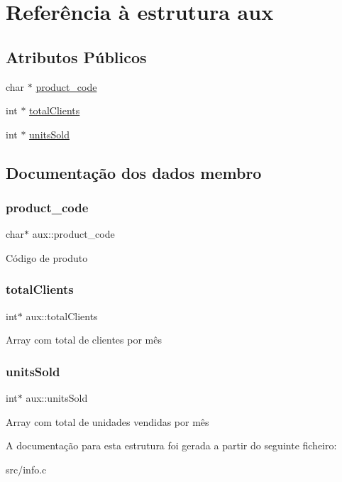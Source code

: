 \hypertarget{structaux}{}\section{Referência à estrutura aux}
\label{structaux}
\subsection*{Atributos Públicos}
\begin{DoxyCompactItemize}
\item 
char $\ast$ \hyperlink{structaux_a31925fb21a149b813caddcd0a0d45be9}{product\+\_\+code}
\item 
int $\ast$ \hyperlink{structaux_a5cc5a22b827b59f431c34c52996d48c9}{total\+Clients}
\item 
int $\ast$ \hyperlink{structaux_a099f3e88271bc2a5f41c8aacf701d907}{units\+Sold}
\end{DoxyCompactItemize}


\subsection{Documentação dos dados membro}
\mbox{\label{structaux_a31925fb21a149b813caddcd0a0d45be9}} 
\subsubsection{\texorpdfstring{product\+\_\+code}{product\_code}}
{\footnotesize\ttfamily char$\ast$ aux\+::product\+\_\+code}

Código de produto \mbox{\label{structaux_a5cc5a22b827b59f431c34c52996d48c9}} 
\subsubsection{\texorpdfstring{total\+Clients}{totalClients}}
{\footnotesize\ttfamily int$\ast$ aux\+::total\+Clients}

Array com total de clientes por mês \mbox{\label{structaux_a099f3e88271bc2a5f41c8aacf701d907}} 
\subsubsection{\texorpdfstring{units\+Sold}{unitsSold}}
{\footnotesize\ttfamily int$\ast$ aux\+::units\+Sold}

Array com total de unidades vendidas por mês 

A documentação para esta estrutura foi gerada a partir do seguinte ficheiro\+:\begin{DoxyCompactItemize}
\item 
src/info.\+c\end{DoxyCompactItemize}
